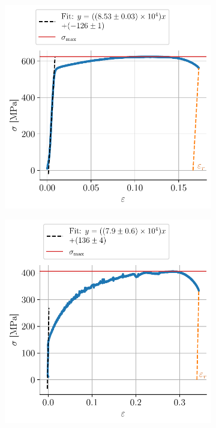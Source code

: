 \begin{figure}[H]
    \centering
    \begin{subfigure}{0.48\linewidth}
        \centering
        \includegraphics[width=\linewidth]{figures/froid1_annotated.pdf}
        \caption{}
        \label{fig:froid1}
    \end{subfigure}
    \begin{subfigure}{0.48\linewidth}
        \centering
        \includegraphics[width=\linewidth]{figures/chaud3_annotated.pdf}

\end{subfigure}
\end{figure}
